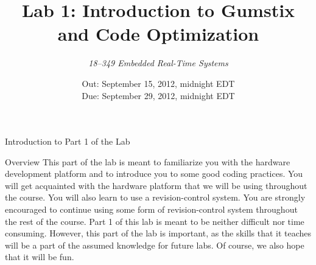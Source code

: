 \documentclass{article}
\title{\huge Lab 1: Introduction to Gumstix and Code Optimization}
\author{\Large\itshape 18--349 Embedded Real-Time Systems}
\date{
	Out: September 15, 2012, midnight EDT\\
	Due: September 29, 2012, midnight EDT \\
}
\begin{document}
	\maketitle

	\setcounter{tocdepth}{2}
	\tableofcontents
	\clearpage

	\begin{section}{Introduction to Part 1 of the Lab}
	\begin{subsection}{Overview} This part of the lab is meant to
	familiarize you with the hardware development platform and to
	introduce you to some good coding practices.  You will get acquainted with the hardware
	platform that we will be using throughout the course.  You
	will also learn to use a revision-control system.  You are
	strongly encouraged to continue using some form of revision-control
	system throughout the rest of the course.  Part 1 of this lab
	is meant to be neither difficult nor time consuming.  However, 
	this part of the lab is important, as the skills that it teaches
	will be a part of the assumed knowledge for future labs.  Of course, we also
	hope that it will be fun.  \end{subsection}


\end{section}
\end{document}
